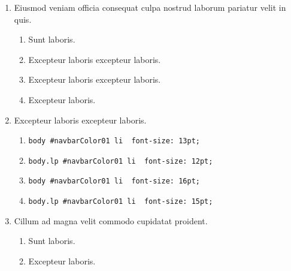 \documentclass[a4paper,12pt]{article}
\begin{document}
\begin{enumerate}[label=\textbf{\arabic*.}]
\begin{multicols}{2}
\begin{enumerate}
		\item  Sunt laboris.
    
		\item  Excepteur laboris excepteur laboris.
    
		\item  Excepteur laboris.
    
	\end{enumerate}

\end{multicols}
\item Eiusmod veniam officia consequat culpa nostrud laborum pariatur velit in quis.
\begin{multicols}{2}
	\begin{enumerate}
		\item  Sunt laboris.
    
		\item  Excepteur laboris excepteur laboris.
  
		\item  Excepteur laboris excepteur laboris.
    
		\item  Excepteur laboris.
    
	\end{enumerate}

\end{multicols}
\item Excepteur laboris excepteur laboris.
	\begin{enumerate}
		\item  \texttt{body \#navbarColor01 li { font-size: 13pt; }}
    
		\item  \texttt{body.lp \#navbarColor01 li { font-size: 12pt; }}
    
		\item  \texttt{body \#navbarColor01 li { font-size: 16pt; }}
  
		\item  \texttt{body.lp \#navbarColor01 li { font-size: 15pt; }}
    
	\end{enumerate}

\item Cillum ad magna velit commodo cupidatat proident.
\begin{multicols}{2}
	\begin{enumerate}
		\item  Sunt laboris.
    
		\item  Excepteur laboris.
    

\end{enumerate}
\end{multicols}
\end{enumerate}
\end{document}
